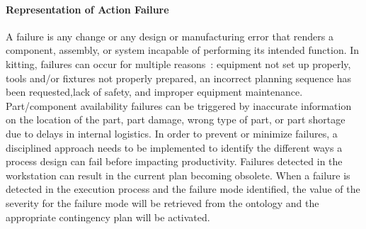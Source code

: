 \paragraph{Representation of Action Failure}\label{sss:failure}
 A failure is any change or any design or manufacturing error that renders a
component, assembly, or system incapable of performing its intended function.
In kitting, failures can occur for multiple reasons~\cite{Leger.1999,Kaiser.2007}: equipment not set up properly,
tools and/or fixtures not properly prepared, an incorrect planning sequence has been requested,lack of safety, and improper equipment
maintenance. Part/component availability failures can be triggered by inaccurate information
on the location of the part, part damage, wrong type of part, or part shortage due to delays
in internal logistics. In order to prevent or minimize failures, a disciplined approach
needs to be implemented to identify the different ways a process design can fail before
impacting productivity. Failures detected in the workstation can result in the current
plan becoming obsolete. When a failure is detected in the execution process and the failure
mode identified, the value of the severity for the failure mode will be retrieved from the
ontology and the appropriate contingency plan will be activated.

